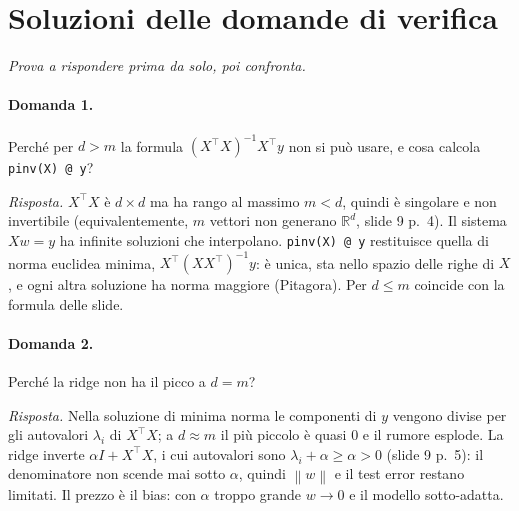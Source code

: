 \documentclass[11pt,a4paper]{article}
\newcommand{\R}{\mathbb{R}}
\newcommand{\norm}[1]{\left\lVert #1 \right\rVert}
\begin{document}
\section{Soluzioni delle domande di verifica}
\emph{Prova a rispondere prima da solo, poi confronta.}

\paragraph{Domanda 1.} Perché per $d > m$ la formula $(X^\top X)^{-1}X^\top y$ non si può usare, e cosa calcola \texttt{pinv(X) @ y}?

\smallskip
\noindent\textit{Risposta.} $X^\top X$ è $d\times d$ ma ha rango al massimo $m < d$, quindi è singolare e non invertibile
(equivalentemente, $m$ vettori non generano $\R^d$, slide 9 p.~4). Il sistema $Xw = y$ ha infinite soluzioni che
interpolano. \texttt{pinv(X) @ y} restituisce quella di norma euclidea minima, $X^\top(XX^\top)^{-1}y$: è unica, sta
nello spazio delle righe di $X$, e ogni altra soluzione ha norma maggiore (Pitagora). Per $d \le m$ coincide con la
formula delle slide.

\paragraph{Domanda 2.} Perché la ridge non ha il picco a $d = m$?

\smallskip
\noindent\textit{Risposta.} Nella soluzione di minima norma le componenti di $y$ vengono divise per gli autovalori
$\lambda_i$ di $X^\top X$; a $d \approx m$ il più piccolo è quasi $0$ e il rumore esplode. La ridge inverte
$\alpha I + X^\top X$, i cui autovalori sono $\lambda_i + \alpha \ge \alpha > 0$ (slide 9 p.~5): il denominatore non
scende mai sotto $\alpha$, quindi $\norm{w}$ e il test error restano limitati. Il prezzo è il bias: con $\alpha$ troppo
grande $w \to 0$ e il modello sotto-adatta.

\end{document}
